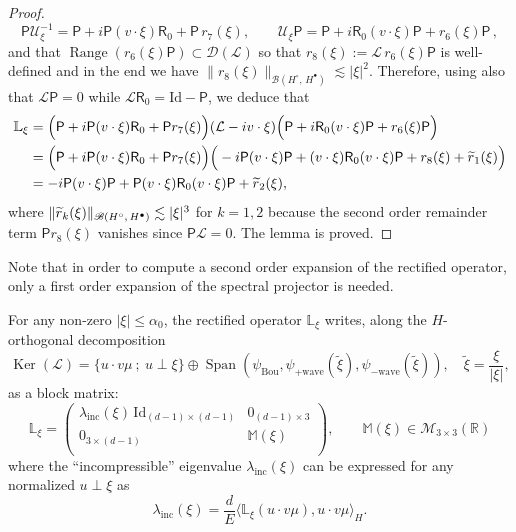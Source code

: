 \documentclass[AHL,Unicode,longabstracts,published]{cedram}
\DeclareMathOperator{\Span}{Span}
\DeclareMathOperator{\range}{Range}
\DeclareMathOperator{\nul}{Ker}
\newcommand{\Id}{\mathrm{Id}}
\newcommand{\Wave}{\mathrm{wave}}
\newcommand{\Inc}{\mathrm{inc}}
\newcommand{\Bou}{\mathrm{Bou}}
\newcommand{\sfR}{\mathsf{R}}
\newcommand{\R}{\mathbb{R}}
\newcommand{\rectL}{\mathbb{L}}
\newcommand{\rectsL}{\mathbb{M}}
\newcommand{\LL}{\mathcal{L}}
\newcommand{\PP}{\mathsf{P}}
\newcommand{\UU}{\mathcal{U}}
\newcommand{\dom}{\mathscr{D}}
\newcommand{\BBB}{\mathscr{B}}
\newcommand{\MMM}{\mathscr{M}}
\newcommand{\Ss}{H}
\newcommand{\Ssp}{H^{\bullet}}
\newcommand{\Ssm}{H^{\circ}}
\renewcommand*\le{\leqslant}
\let\oldtilde\tilde
\renewcommand*{\tilde}[1]{\mathchoice{\widetilde{#1}}{\widetilde{#1}}{\oldtilde{#1}}{\oldtilde{#1}}}
\begin{document}
\begin{proof}
\begin{equation}\label{eq:expansion_Kato_isomorphismPP}
\PP\UU^{-1}_\xi=\PP + i \PP (v \cdot \xi)\sfR_{0} + \PP\, r_{7}(\xi), \qquad \UU_{\xi}\PP=\PP + i\sfR_{0}(v\cdot\xi)\PP+r_{6}(\xi)\PP\,,
\end{equation}
and that $\range(r_{6}(\xi)\PP) \subset \dom(\LL)$ so that $r_{8}(\xi):=\LL\,r_{6}(\xi)\PP$ is well-defined and in the end we have $\|r_{8}(\xi) \|_{\BBB(\Ssm,\,\Ssp)} \lesssim |\xi|^{2}$. Therefore, using also that $\LL \PP=0$ while $\LL\sfR_{0}=\Id-\PP$, we deduce that
\begin{align*}
\rectL_\xi & = \Big(\PP + i \PP (v \cdot \xi)\sfR_{0} + \PP r_{7}(\xi) \Big) (\LL - i v \cdot \xi) \Big(\PP + i\sfR_{0} (v \cdot \xi) \PP + r_{6}(\xi)\PP\Big) \\
&= \Big(\PP + i \PP (v \cdot \xi)\sfR_{0} + \PP r_{7}(\xi) \Big) \Big(- i \PP (v \cdot \xi) \PP + (v \cdot\xi) \sfR_{0} (v \cdot \xi) \PP + r_{8}(\xi) + \tilde{r}_{1}(\xi)\Big) \\
&= - i \PP (v \cdot \xi) \PP + \PP (v \cdot \xi)\sfR_{0} (v \cdot \xi) \PP + \tilde{r}_{2}(\xi),
\end{align*}
where $\|\tilde{r}_{k}(\xi)\|_{\BBB(\Ssm,\,\Ssp)} \lesssim |\xi|^{3}$ for $k=1,2$ because the second order remainder term $\PP r_{8}(\xi)$ vanishes since $\PP\LL=0$. The lemma is proved.
\end{proof}

\begin{rema}
Note that in order to compute a second order expansion of the rectified operator, only a first order expansion of the spectral projector is needed.
\end{rema}

\begin{lemm}\label{lem:rectified_block_matrix}
For any non-zero $|\xi| \le \alpha_0$, the rectified operator $\rectL_\xi$ writes, along the $\Ss$-orthogonal decomposition
\begin{equation*}
\nul(\LL) = \Big\{ u \cdot v \mu~;~u \perp \xi \Big \} \oplus \Span\left(\psi_{\Bou}, \psi_{+\Wave}\left(\widetilde{\xi} \right), \psi_{-\Wave}\left(\widetilde{\xi} \right) \right), \quad \widetilde{\xi}=\frac{\xi}{|\xi|},
\end{equation*}
as a block matrix:
\begin{equation}\label{eq:LLXIMXI}
\rectL_{\xi} = \left(
\begin{matrix}
\lambda_\Inc(\xi) \, \Id_{(d-1) \times (d-1)} & 0_{(d-1) \times 3} \\
0_{3 \times (d-1)} & \rectsL(\xi) \\
\end{matrix}
\right), \qquad \rectsL(\xi) \in \MMM_{3\times3}(\R)
\end{equation}
where the ``incompressible'' eigenvalue $\lambda_\Inc(\xi)$ can be expressed for any normalized $u \perp \xi$ as
\begin{equation*}
\lambda_\Inc(\xi) = \frac{d}{E} \big\langle \rectL_\xi (u \cdot v \mu), u \cdot v \mu \big\rangle_{\Ss}.
\end{equation*}
\end{lemm}
\end{document}

